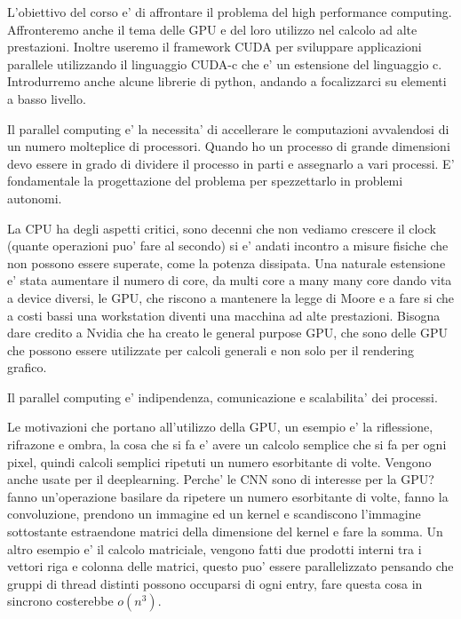 L'obiettivo del corso e' di affrontare il problema del high performance computing.
Affronteremo anche il tema delle GPU e del loro utilizzo nel calcolo ad alte prestazioni. Inoltre useremo il framework CUDA per sviluppare applicazioni parallele utilizzando il linguaggio CUDA-c che e' un estensione del linguaggio c.
Introdurremo anche alcune librerie di python, andando a focalizzarci su elementi a basso livello.

Il parallel computing e' la necessita' di accellerare le computazioni avvalendosi di un numero molteplice di processori. Quando ho un processo di grande dimensioni devo essere in grado di dividere il processo in parti e assegnarlo a vari processi. E' fondamentale la progettazione del problema per spezzettarlo in problemi autonomi.

La CPU ha degli aspetti critici, sono decenni che non vediamo crescere il clock (quante operazioni puo' fare al secondo) si e' andati incontro a misure fisiche che non possono essere superate, come la potenza dissipata.
Una naturale estensione e' stata aumentare il numero di core, da multi core a many many core dando vita a device diversi, le GPU, che riscono a mantenere la legge di Moore e a fare si che a costi bassi una workstation diventi una macchina ad alte prestazioni. Bisogna dare credito a Nvidia che ha creato le general purpose GPU, che sono delle GPU che possono essere utilizzate per calcoli generali e non solo per il rendering grafico.

Il parallel computing e' indipendenza, comunicazione e scalabilita' dei processi.

Le motivazioni che portano all'utilizzo della GPU, un esempio e' la riflessione, rifrazone e ombra, la cosa che si fa e' avere un calcolo semplice che si fa per ogni pixel, quindi calcoli semplici ripetuti un numero esorbitante di volte.
Vengono anche usate per il deeplearning. Perche' le CNN sono di interesse per la GPU? fanno un'operazione basilare da ripetere un numero esorbitante di volte, fanno la convoluzione, prendono un immagine ed un kernel e scandiscono l'immagine sottostante estraendone matrici della dimensione del kernel e fare la somma.
Un altro esempio e' il calcolo matriciale, vengono fatti due prodotti interni tra i vettori riga e colonna delle matrici, questo puo' essere parallelizzato pensando che gruppi di thread distinti possono occuparsi di ogni entry, fare questa cosa in sincrono costerebbe $o(n^3)$.

